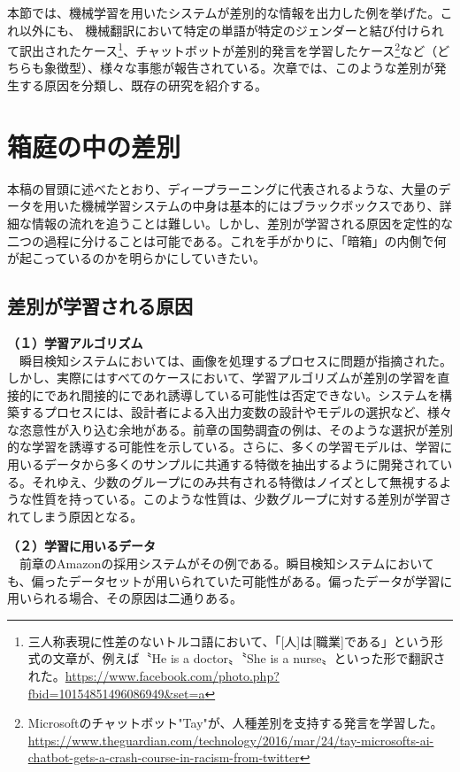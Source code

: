 \documentclass[b5j,twoside,twocolumn]{utarticle}
\begin{document}
本節では、機械学習を用いたシステムが差別的な情報を出力した例を挙げた。これ以外にも、
機械翻訳において特定の単語が特定のジェンダーと結び付けられて訳出されたケース\footnote{三人称表現に性差のないトルコ語において、「[人]は[職業]である」という形式の文章が、例えば〝He is a doctor〟〝She is a nurse〟といった形で翻訳された。\url{https://www.facebook.com/photo.php?fbid=10154851496086949&set=a}}、チャットボットが差別的発言を学習したケース\footnote{Microsoftのチャットボット"Tay"が、人種差別を支持する発言を学習した。\\\url{https://www.theguardian.com/technology/2016/mar/24/tay-microsofts-ai-chatbot-gets-a-crash-course-in-racism-from-twitter}}など（どちらも象徴型）、様々な事態が報告されている。次章では、このような差別が発生する原因を分類し、既存の研究を紹介する。
\section{箱庭の中の差別}
本稿の冒頭に述べたとおり、ディープラーニングに代表されるような、大量のデータを用いた機械学習システムの中身は基本的にはブラックボックスであり、詳細な情報の流れを追うことは難しい。しかし、差別が学習される原因を定性的な二つの過程に分けることは可能である。これを手がかりに、「暗箱」の\.内\.側で何が起こっているのかを明らかにしていきたい。
\subsection{差別が学習される原因}
\textbf{（１）学習アルゴリズム}\\
~~瞬目検知システムにおいては、画像を処理するプロセスに問題が指摘された。
しかし、実際にはすべてのケースにおいて、学習アルゴリズムが差別の学習を直接的にであれ間接的にであれ誘導している可能性は否定できない。システムを構築するプロセスには、設計者による入出力変数の設計やモデルの選択など、様々な恣意性が入り込む余地がある。前章の国勢調査の例は、そのような選択が差別的な学習を誘導する可能性を示している。さらに、多くの学習モデルは、学習に用いるデータから多くのサンプルに共通する特徴を抽出するように開発されている。それゆえ、少数のグループにのみ共有される特徴はノイズとして無視するような性質を持っている。このような性質は、少数グループに対する差別が学習されてしまう原因となる。


\textbf{（２）学習に用いるデータ}\\
~~前章のAmazonの採用システムがその例である。瞬目検知システムにおいても、偏ったデータセットが用いられていた可能性がある。偏ったデータが学習に用いられる場合、その原因は二通りある。
\end{document}
